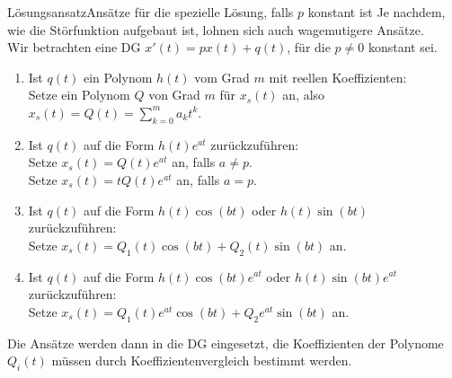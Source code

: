 
\begin{Satz}
{Lösungsansatz}{Ansätze für die spezielle Lösung{,} falls $p$ konstant ist}
Je nachdem, wie die Störfunktion aufgebaut ist, lohnen sich auch wagemutigere Ansätze.\\
Wir betrachten eine DG $x'(t)=px(t)+q(t)$, für die $p\neq0$ konstant sei.
\begin{enumerate}
    \item Ist $q(t)$ ein Polynom $h(t)$ vom Grad $m$ mit reellen Koeffizienten:\\
    Setze ein Polynom $Q$ von Grad $m$ für $x_s(t)$ an, also $x_s(t)=Q(t)=\sum_{k=0}^ma_kt^k$.
    \item Ist $q(t)$ auf die Form $h(t)e^{at}$ zurückzuführen:\\
    Setze $x_s(t)=Q(t)e^{at}$ an, falls $a\neq p$.\\
    Setze $x_s(t)=tQ(t)e^{at}$ an, falls $a=p$.
    \item Ist $q(t)$ auf die Form $h(t)\cos(bt)$ oder $h(t)\sin(bt)$ zurückzuführen:\\
    Setze $x_s(t)=Q_1(t)\cos(bt)+Q_2(t)\sin(bt)$ an.
    \item Ist $q(t)$ auf die Form $h(t)\cos(bt)e^{at}$ oder $h(t)\sin(bt)e^{at}$ zurückzuführen:\\
    Setze $x_s(t)=Q_1(t)e^{at}\cos(bt)+Q_2e^{at}\sin(bt)$ an.
\end{enumerate}
Die Ansätze werden dann in die DG eingesetzt, die Koeffizienten der Polynome $Q_i(t)$ müssen durch Koeffizientenvergleich bestimmt werden.
\end{Satz}
